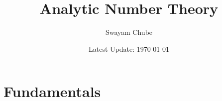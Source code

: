 \documentclass[12pt, oneside]{report}
\title{Analytic Number Theory}
\author{Swayam Chube}
\date{Latest Update: \today}
\begin{document}
    \maketitle 
    \tableofcontents
    \chapter{Fundamentals}
    
\end{document}
